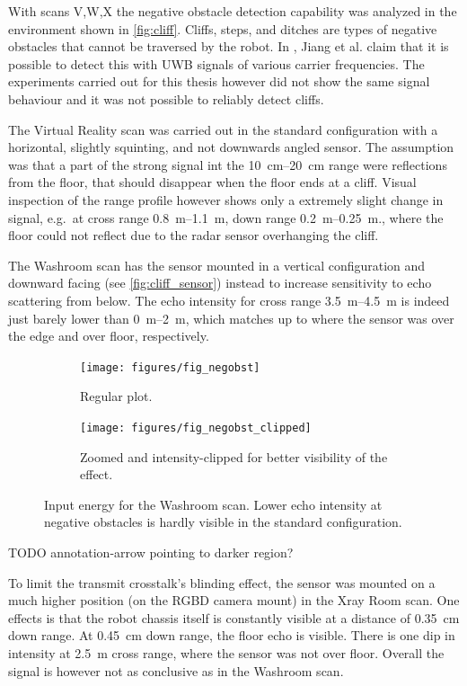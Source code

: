 With scans V,W,X the negative obstacle detection capability was
analyzed in the environment shown in \cref{fig:cliff}. Cliffs, steps, and ditches are types of negative obstacles that cannot be traversed by the robot. In \cite{Jiang2015}, Jiang et al. claim that it is possible to detect this with UWB signals of various carrier frequencies. The experiments carried out for this thesis however did not show the same signal behaviour and it was not possible to reliably detect cliffs.

The Virtual Reality scan was carried out in the standard configuration
with a horizontal, slightly squinting, and not downwards angled sensor.
The assumption was that a part of the strong signal int the \SIrange{10}{20}{cm}
range were reflections from the floor, that should disappear when the
floor ends at a cliff. Visual inspection of the range profile however
shows only a extremely slight change in signal, e.g.~at cross range
\SIrange{0.8}{1.1}{m}, down range \SIrange{0.2}{0.25}{m}., where the floor could not reflect due to the radar sensor overhanging the cliff.

The Washroom scan has the sensor mounted in a vertical configuration and
downward facing (see \cref{fig:cliff_sensor}) instead to increase sensitivity to echo scattering from below. The echo intensity for cross range \SIrange{3.5}{4.5}{m} is indeed just
barely lower than \SIrange{0}{2}{m}, which matches up to where the sensor was over
the edge and over floor, respectively.

\begin{figure}[htbp]
    \centering
    \begin{subfigure}[t]{.475\textwidth}
        \texttt{[image: figures/fig\_negobst]}
        \caption{Regular plot.}
        \label{fig:negobst}
    \end{subfigure}%
    \hfill%
    \begin{subfigure}[t]{.475\textwidth}
        \texttt{[image: figures/fig\_negobst\_clipped]}
        \caption{Zoomed and intensity-clipped for better visibility of the effect.}
        \label{fig:negobst_clipped}
    \end{subfigure}
    \caption{Input energy for the Washroom scan. Lower echo intensity at negative obstacles is hardly visible in the standard configuration.}
\end{figure}

TODO annotation-arrow pointing to darker region?

To limit the transmit crosstalk's blinding effect, the sensor was
mounted on a much higher position (on the RGBD camera mount) in the Xray
Room scan. One effects is that the robot chassis itself is constantly
visible at a distance of \SI{0.35}{cm} down range. At \SI{0.45}{cm} down range, the
floor echo is visible. There is one dip in intensity at \SI{2.5}{m} cross
range, where the sensor was not over floor. Overall the signal is
however not as conclusive as in the Washroom scan.

